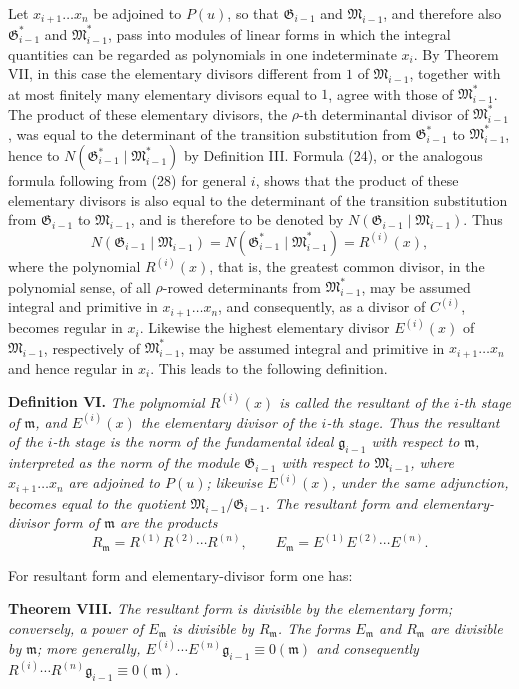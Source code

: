 \documentclass[11pt]{article}
\providecommand{\Gmod}{\mathfrak G}
\providecommand{\Mmod}{\mathfrak M}
\providecommand{\mideal}{\mathfrak m}
\providecommand{\gideal}{\mathfrak g}
\begin{document}
Let $x_{i+1}\ldots x_n$ be adjoined to $P(u)$, so that $\Gmod_{i-1}$ and $\Mmod_{i-1}$, and therefore also $\Gmod^*_{i-1}$ and $\Mmod^*_{i-1}$, pass into modules of linear forms in which the integral quantities can be regarded as polynomials in one indeterminate $x_i$. By Theorem VII, in this case the elementary divisors different from $1$ of $\Mmod_{i-1}$, together with at most finitely many elementary divisors equal to $1$, agree with those of $\Mmod^*_{i-1}$. The product of these elementary divisors, the $\rho$-th determinantal divisor of $\Mmod^*_{i-1}$, was equal to the determinant of the transition substitution from $\Gmod^*_{i-1}$ to $\Mmod^*_{i-1}$, hence to $N(\Gmod^*_{i-1}\mid\Mmod^*_{i-1})$ by Definition III. Formula (24), or the analogous formula following from (28) for general $i$, shows that the product of these elementary divisors is also equal to the determinant of the transition substitution from $\Gmod_{i-1}$ to $\Mmod_{i-1}$, and is therefore to be denoted by $N(\Gmod_{i-1}\mid\Mmod_{i-1})$. Thus
\[
 N(\Gmod_{i-1}\mid\Mmod_{i-1})=N(\Gmod^*_{i-1}\mid\Mmod^*_{i-1})=R^{(i)}(x),
\]
where the polynomial $R^{(i)}(x)$, that is, the greatest common divisor, in the polynomial sense, of all $\rho$-rowed determinants from $\Mmod^*_{i-1}$, may be assumed integral and primitive in $x_{i+1}\ldots x_n$, and consequently, as a divisor of $C^{(i)}$, becomes regular in $x_i$. Likewise the highest elementary divisor $E^{(i)}(x)$ of $\Mmod_{i-1}$, respectively of $\Mmod^*_{i-1}$, may be assumed integral and primitive in $x_{i+1}\ldots x_n$ and hence regular in $x_i$. This leads to the following definition.

\medskip
\noindent\textbf{Definition VI.} \emph{The polynomial $R^{(i)}(x)$ is called the resultant of the $i$-th stage of $\mideal$, and $E^{(i)}(x)$ the elementary divisor of the $i$-th stage. Thus the resultant of the $i$-th stage is the norm of the fundamental ideal $\gideal_{i-1}$ with respect to $\mideal$, interpreted as the norm of the module $\Gmod_{i-1}$ with respect to $\Mmod_{i-1}$, where $x_{i+1}\ldots x_n$ are adjoined to $P(u)$; likewise $E^{(i)}(x)$, under the same adjunction, becomes equal to the quotient $\Mmod_{i-1}/\Gmod_{i-1}$. The resultant form and elementary-divisor form of $\mideal$ are the products}
\[
 R_\mideal=R^{(1)}R^{(2)}\cdots R^{(n)},\qquad
 E_\mideal=E^{(1)}E^{(2)}\cdots E^{(n)}.
\]

For resultant form and elementary-divisor form one has:

\medskip
\noindent\textbf{Theorem VIII.} \emph{The resultant form is divisible by the elementary form; conversely, a power of $E_\mideal$ is divisible by $R_\mideal$. The forms $E_\mideal$ and $R_\mideal$ are divisible by $\mideal$; more generally, $E^{(i)}\cdots E^{(n)}\gideal_{i-1}\equiv0(\mideal)$ and consequently $R^{(i)}\cdots R^{(n)}\gideal_{i-1}\equiv0(\mideal)$.}
\end{document}
